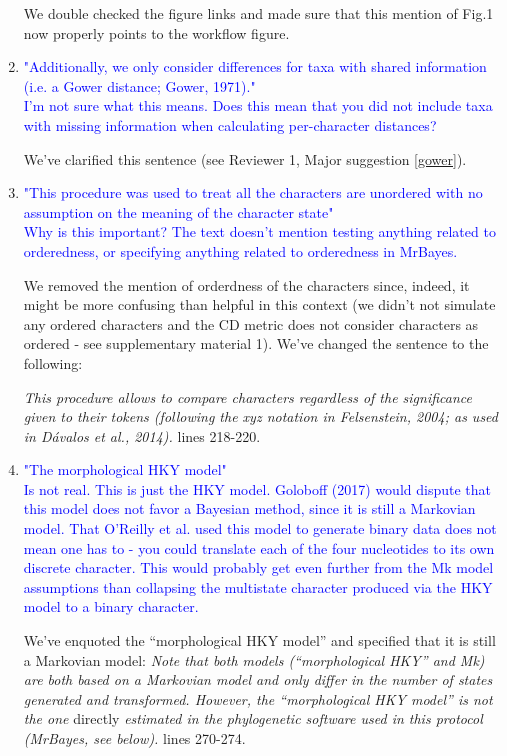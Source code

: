 \documentclass[12pt,letterpaper]{article}
\begin{document}
\begin{enumerate}
We double checked the figure links and made sure that this mention of Fig.1 now properly points to the workflow figure.

\item{\textcolor{blue}{"Additionally, we only consider differences for taxa with shared information (i.e. a Gower distance; Gower, 1971)."\\
I'm not sure what this means. Does this mean that you did not include taxa with missing information when calculating per-character distances?}}

We've clarified this sentence (see Reviewer 1, Major suggestion \ref{gower}).

\item{\textcolor{blue}{"This procedure was used to treat all the characters are unordered with no assumption on the meaning of the character state"\\
Why is this important? The text doesn't mention testing anything related to orderedness, or specifying anything related to orderedness in MrBayes.}}

We removed the mention of orderdness of the characters since, indeed, it might be more confusing than helpful in this context (we didn't not simulate any ordered characters and the CD metric does not consider characters as ordered - see supplementary material 1). We've changed the sentence to the following:

\textit{This procedure allows to compare characters regardless of the significance given to their tokens (following the \textit{xyz} notation in Felsenstein, 2004; as used in D\'{a}valos et al., 2014).} lines 218-220.

\item{\textcolor{blue}{"The morphological HKY model"\\
Is not real. This is just the HKY model. Goloboff (2017) would dispute that this model does not favor a Bayesian method, since it is still a Markovian model. That O'Reilly et al. used this model to generate binary data does not mean one has to - you could translate each of the four nucleotides to its own discrete character. This would probably get even further from the Mk model assumptions than collapsing the multistate character produced via the HKY model to a binary character.}}

We've enquoted the ``morphological HKY model'' and specified that it is still a Markovian model:
\textit{Note that both models (``morphological HKY'' and Mk) are both based on a Markovian model and only differ in the number of states generated and transformed.
However, the ``morphological HKY model'' is not the one} directly \textit{estimated in the phylogenetic software used in this protocol (MrBayes, see below).} lines 270-274.


\end{enumerate}
\end{document}
